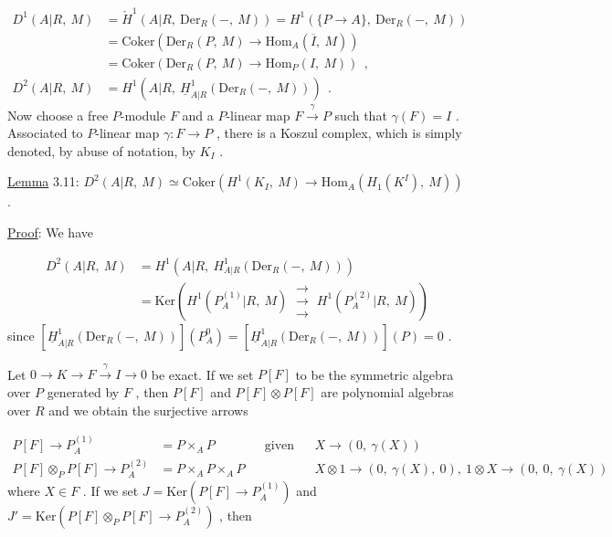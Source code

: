 \begin{equation*}
\begin{aligned}
D^1(A|R,\ M) &= \check{H}^1(A|R,\ \mathrm{Der}_R(-,\ M)) = H^1(\{P \to A\},\ \mathrm{Der}_R(-,\ M)) \\
&= \mathrm{Coker}(\mathrm{Der}_R(P,\ M) \to \mathrm{Hom}_A(\overline{I},\ M)) \\
&= \mathrm{Coker}(\mathrm{Der}_R(P,\ M) \to \mathrm{Hom}_P(I,\ M)) \ \ , \\
D^2(A|R,\ M) &= H^1(A|R,\ \underline{H}^1_{A|R}(\mathrm{Der}_R(-,\ M))) \ \ .
\end{aligned}
\end{equation*}
Now choose a free $P$-module  $F$  and a $P$-linear map  $F \xrightarrow{\ \gamma\ } P$  such that  $\gamma(F) = I$  . Associated to $P$-linear map  $\gamma : F \to P$  , there is a Koszul complex, which is simply denoted, by abuse of notation, by  $K_I$  .


\underline{Lemma} 3.11:   $D^2(A|R,\ M) \simeq \mathrm{Coker}(H^1(K_I,\ M) \to \mathrm{Hom}_A(H_1(K^I),\ M))$ .

\underline{Proof}:  We have

\begin{equation*}
\begin{aligned}
D^2(A|R,\ M) &= H^1(A|R,\ H^1_{A|R}(\mathrm{Der}_R(-,\ M))) \\
&= \mathrm{Ker}(H^1(P_A^{(1)}|R,\ M) \ \mathrel{\substack{\to\\ \to\\ \to}} \ H^1(P_A^{(2)}|R,\ M))
\end{aligned}
\end{equation*}
since  $[\underline{H}^1_{A|R}(\mathrm{Der}_R(-,\ M))](P_A^0) = [\underline{H}^1_{A|R}(\mathrm{Der}_R(-,\ M))](P) = 0$  .

Let  $0 \to K \to F \xrightarrow{\ \gamma\ } I \to 0$  be exact. If we set  $P[F]$  to be the symmetric algebra over  $P$  generated by  $F$  , then  $P[F]$  and  $P[F]\otimes P[F]$  are polynomial algebras over  $R$  and we obtain the surjective arrows

\begin{equation*}
\begin{aligned}
P[F] \to P_A^{(1)} &= P\times_A P &&\text{given by} && X \to (0,\ \gamma(X)) \\
P[F]\otimes_P P[F] \to P_A^{(2)} &= P\times_A P\times_A P && && X\otimes 1 \to (0,\ \gamma(X),\ 0),\ 1\otimes X \to (0,\ 0,\ \gamma(X))
\end{aligned}
\end{equation*}
where  $X \in F$  . If we set  $J = \mathrm{Ker}(P[F] \to P_A^{(1)})$ and
$J' = \mathrm{Ker}(P[F]\otimes_P P[F] \to P_A^{(2)})$  , then 


